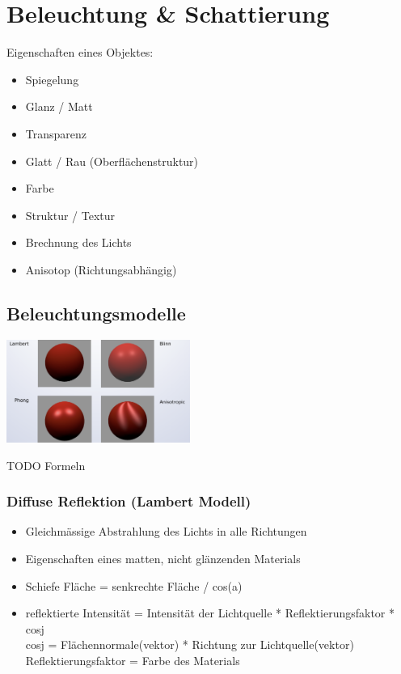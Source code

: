 \section{Beleuchtung \& Schattierung}

Eigenschaften eines Objektes:
\begin{itemize}
	\item Spiegelung
	\item Glanz / Matt
	\item Transparenz
	\item Glatt / Rau (Oberflächenstruktur) 
	\item Farbe
	\item Struktur / Textur
	\item Brechnung des Lichts
	\item Anisotop (Richtungsabhängig)
\end{itemize}


\subsection{Beleuchtungsmodelle}
\includegraphics[width=0.45\textwidth]{assets/Beleuchtungsmodelle.png}

TODO Formeln

\subsubsection{Diffuse Reflektion (Lambert Modell)}

\begin{itemize}
	\item Gleichmässige Abstrahlung des Lichts in alle Richtungen
	\item Eigenschaften eines matten, nicht glänzenden Materials
	\item Schiefe Fläche = senkrechte Fläche / cos(a)
	\item reflektierte Intensität = Intensität der Lichtquelle * Reflektierungsfaktor * cosj \\
	cosj = Flächennormale(vektor) * Richtung zur Lichtquelle(vektor) \\
	Reflektierungsfaktor = Farbe des Materials
\end{itemize}

